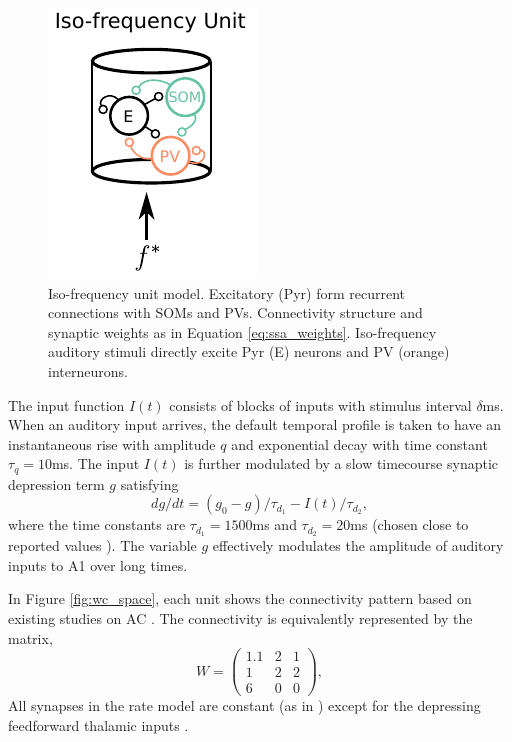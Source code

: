 \documentclass[a4paper,10pt]{article}
\begin{document}
\begin{figure}
\centering
 \includegraphics[]{col1.pdf}
 \caption{Iso-frequency unit model. Excitatory (Pyr) form recurrent connections with SOMs and PVs. Connectivity structure and synaptic weights as in Equation \eqref{eq:ssa_weights}. Iso-frequency auditory stimuli directly excite Pyr (E) neurons and PV (orange) interneurons.}\label{ref:col1}
\end{figure}


The input function $I(t)$ consists of blocks of inputs with stimulus interval $\delta$ms. When an auditory input arrives, the default temporal profile is taken to have an instantaneous rise with amplitude $q$ and exponential decay with time constant $\tau_q=10$ms. The input $I(t)$ is further modulated by a slow timecourse synaptic depression term $g$ satisfying
\begin{equation}\label{eq:thal}
 dg/dt = (g_0 - g)/\tau_{d_1} - I(t)/\tau_{d_2},
\end{equation}
where the time constants are $\tau_{d_1} = 1500$ms and $\tau_{d_2}=20$ms (chosen close to reported values \cite{natan2015complementary}). The variable $g$ effectively modulates the amplitude of auditory inputs to A1 over long times.

In Figure \ref{fig:wc_space}, each unit shows the connectivity pattern based on existing studies on AC \cite{pfeffer2013inhibition}. The connectivity is equivalently represented by the matrix,
\begin{equation}\label{eq:ssa_weights}
 W = \left(\begin{matrix}
      1.1 & 2 & 1\\
      1   & 2 & 2\\
      6   & 0 & 0
     \end{matrix}\right),
\end{equation}
All synapses in the rate model are constant (as in \cite{mill2011neurocomputational}) except for the depressing feedforward thalamic inputs \cite{lee2008synaptic}.
\end{document}
